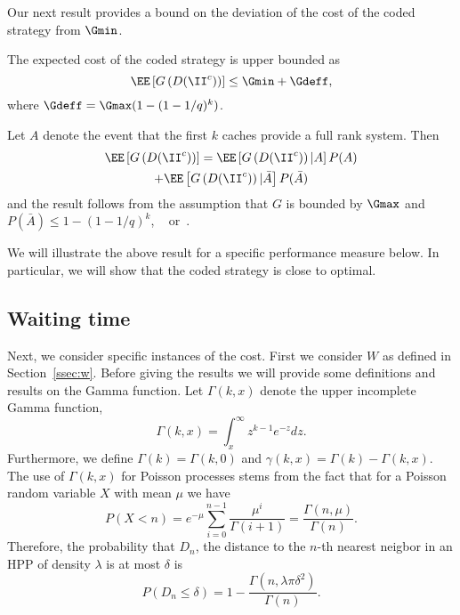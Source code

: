 Our next result provides a bound on the deviation of the cost of the coded strategy from $\Gmin$.
\begin{theorem} \label{th:upper}
The expected cost of the coded strategy is upper bounded as
\begin{equation}
\EE\left[ G\left(D(\II^c)\right) \right] \leq \Gmin + \Gdeff, \end{equation}
where $\Gdeff=\Gmax(1-(1-1/q)^k)$.
\end{theorem}
\begin{IEEEproof} Let $A$ denote the event that the first $k$ caches provide a full rank system. Then
\begin{multline}
\EE\left[ G\left(D(\II^c)\right) \right]  = \EE\left[ G\left(D(\II^c)\right) | A \right]P(A) \\ + \EE\left[ G\left(D(\II^c)\right) | \bar A \right] P(\bar A)
\end{multline}
and the result follows from the assumption that $G$ is bounded by $\Gmax$ and $P(\bar A)\leq 1-(1-1/q)^k$, \cf~\cite{ho2006random} or~\cite{ncfundamentals}.
\end{IEEEproof}
We will illustrate the above result for a specific performance measure below. In particular, we will show that the coded strategy is close to optimal.

\subsection{Waiting time}

Next, we consider specific instances of the cost. First we consider $W$ as defined in Section~\ref{ssec:w}. Before giving the results we will provide some definitions and results on the Gamma function. Let $\Gamma(k,x)$ denote the upper incomplete Gamma function, \ie
\begin{equation}
 \Gamma(k,x) = \int_x^\infty z^{k-1}e^{-z}dz. \end{equation}
Furthermore, we define $\Gamma(k)=\Gamma(k,0)$ and $\gamma(k,x) = \Gamma(k) - \Gamma(k,x)$. The use of $\Gamma(k,x)$ for Poisson processes stems from the fact that for a Poisson random variable $X$ with mean $\mu$ we have
\begin{equation}
P(X<n) = e^{-\mu}\sum_{i=0}^{n-1}\frac{\mu^i}{\Gamma(i+1)} = \frac{\Gamma(n,\mu)}{\Gamma(n)}.
\end{equation}
Therefore, the probability that $D_n$, the distance to the $n$-th nearest neigbor in an HPP of density $\lambda$ is at most $\delta$ is
\begin{equation}
P\left(D_n\leq \delta\right) = 1-\frac{\Gamma(n,\lambda\pi\delta^2)}{\Gamma(n)}.
\end{equation}


